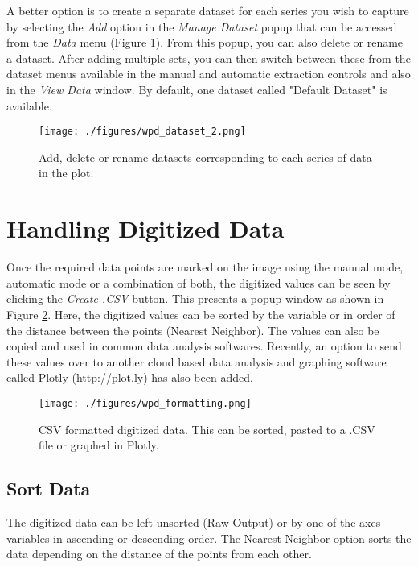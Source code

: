 \documentclass[letterpaper, 10pt]{article}
\begin{document}
A better option is to create a separate dataset for each series you wish to capture by selecting the \emph{Add} option in the \emph{Manage Dataset} popup that can be accessed from the \emph{Data} menu (Figure \ref{fig:manageDatasets}). From this popup, you can also delete or rename a dataset. After adding multiple sets, you can then switch between these from the dataset menus available in the manual and automatic extraction controls and also in the \emph{View Data} window. By default, one dataset called "Default Dataset" is available.
\begin{figure}
\begin{center}
\texttt{[image: ./figures/wpd\_dataset\_2.png]}
\caption{Add, delete or rename datasets corresponding to each series of data in the plot.}
\label{fig:manageDatasets}
\end{center}
\end{figure}

 
\section{Handling Digitized Data}
\label{sec:csvData}
Once the required data points are marked on the image using the manual mode, automatic mode or a combination of both, the digitized values can be seen by clicking the \emph{Create .CSV} button. This presents a popup window as shown in Figure \ref{fig:csvOutput}. Here, the digitized values can be sorted by the variable or in order of the distance between the points (Nearest Neighbor). The values can also be copied and used in common data analysis softwares. Recently, an option to send these values over to another cloud based data analysis and graphing software called Plotly (\url{http://plot.ly}) has also been added.
 
\begin{figure}
\begin{center}
\texttt{[image: ./figures/wpd\_formatting.png]}
\caption{CSV formatted digitized data. This can be sorted, pasted to a .CSV file or graphed in Plotly.}
\label{fig:csvOutput}
\end{center}
\end{figure}
\subsection{Sort Data}
The digitized data can be left unsorted (Raw Output) or by one of the axes variables in ascending or descending order. The Nearest Neighbor option sorts the data depending on the distance of the points from each other.
\end{document}
